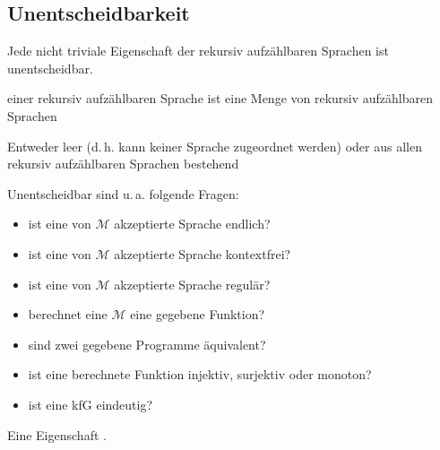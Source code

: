\subsection{Unentscheidbarkeit}
\begin{satz}
	Jede nicht triviale Eigenschaft der rekursiv aufzählbaren Sprachen ist unentscheidbar.
\end{satz}
\begin{description}\item
	\item [Eigenschaft] einer rekursiv aufzählbaren Sprache ist eine Menge von rekursiv aufzählbaren Sprachen
	\item [trivial] Entweder leer (d.\,h. kann keiner Sprache zugeordnet werden) oder aus allen rekursiv aufzählbaren Sprachen bestehend
\end{description}


Unentscheidbar sind u.\,a. folgende Fragen:
\begin{itemize}\itemsep0em
	\item ist eine von $\mathcal{M}$ akzeptierte Sprache endlich?
	\item ist eine von $\mathcal{M}$ akzeptierte Sprache kontextfrei?
	\item ist eine von $\mathcal{M}$ akzeptierte Sprache regulär?
	\item berechnet eine $\mathcal{M}$ eine gegebene Funktion?
	\item sind zwei gegebene Programme äquivalent?
	\item ist eine berechnete Funktion injektiv, surjektiv oder monoton?
	\item ist eine kfG eindeutig?
\end{itemize}


Eine Eigenschaft .
